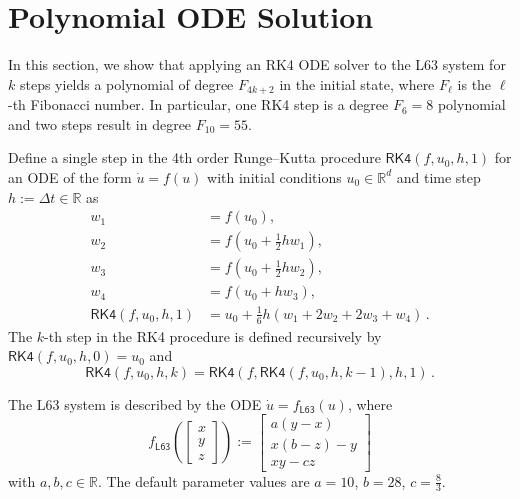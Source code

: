 \documentclass{article}
\newcommand*{\ms}[1]{\mathsf{#1}}
\newcommand{\R}{\mathbb{R}}
\newcommand{\lb}{\left(} %
\newcommand{\rb}{\right)} %
\newcommand{\br}[1]{\lb #1 \rb} %
\newcommand{\brOf}[1]{\!\br{#1}} %
\newcommand{\eqfs}{\,.}
\newcommand{\stepsize}{\Delta\!t}
\begin{document}
\clearpage
\section{Polynomial ODE Solution}\label{app:sec:poly}

In this section, we show that applying an RK4 ODE solver to the L63 system for $k$ steps yields a polynomial of degree $F_{4k+2}$ in the initial state, where $F_\ell$ is the $\ell$-th Fibonacci number. In particular, one RK4 step is a degree $F_{6} = 8$ polynomial and two steps result in degree $F_{10} = 55$.

Define a single step in the 4th order Runge--Kutta procedure $\mathsf{RK4}\brOf{f, u_0, h, 1}$ for an ODE of the form $\dot u = f(u)$ with initial conditions $u_0\in \R^d$ and time step $h := \stepsize\in\R$ as
\begin{equation*}
	\begin{aligned}
		w_1 &= f(u_0), \\
		w_2 &= f\brOf{u_0 + \frac{1}{2}h w_1}, \\
		w_3 &= f\brOf{u_0 + \frac{1}{2}h w_2}, \\
		w_4 &= f\brOf{u_0 + h w_3}, \\
		\mathsf{RK4}\brOf{f, u_0, h, 1} &= u_0 + \frac{1}{6} h (w_1 + 2w_2 + 2w_3 + w_4)
		\eqfs
	\end{aligned}
\end{equation*}
%
The $k$-th step in the RK4 procedure is defined recursively by $\mathsf{RK4}\brOf{f, u_0, h, 0} = u_0$ and
\begin{equation*}
	\mathsf{RK4}\brOf{f, u_0, h, k} = \mathsf{RK4}\brOf{f, \mathsf{RK4}\brOf{f, u_0, h, k-1}, h, 1}
	\eqfs
\end{equation*}

The L63 system is described by the ODE $\dot u = f_{\ms{L63}}(u)$, where
\begin{equation*}
	f_{\mathsf{L63}}\brOf{\begin{bmatrix}
			x\\y\\z
	\end{bmatrix}} :=
	\begin{bmatrix}
		a(y-x)\\
		x(b - z) - y\\
		xy - c z
	\end{bmatrix}
\end{equation*}
with $a,b,c\in\R$. The default parameter values are $a = 10$, $b = 28$, $c = \frac83$.
\end{document}
